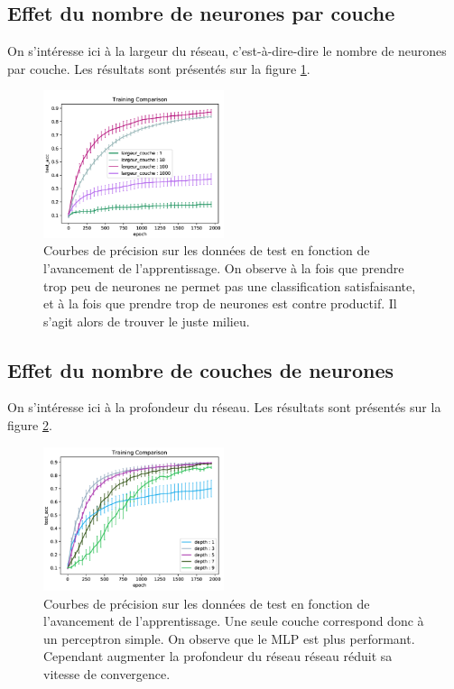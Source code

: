 \subsection{Effet du nombre de neurones par couche}
On s'intéresse ici à la largeur du réseau, c’est-à-dire-dire le nombre de neurones par couche. Les résultats sont présentés sur la figure \ref{MLP_largeur}.

\begin{figure}[!h]
\centering
\includegraphics[width=150pt]{"images/MLP/MLP_largeur"}
\caption{Courbes de précision sur les données de test en fonction de l'avancement de l'apprentissage. On observe  à la fois que prendre trop peu de neurones ne permet pas une classification satisfaisante, et à la fois que prendre trop de neurones est contre productif. Il s'agit alors de trouver le juste milieu.\\ }
\label{MLP_largeur}
\end{figure}

\subsection{Effet du nombre de couches de neurones}
On s'intéresse ici à la profondeur du réseau. Les résultats sont présentés sur la figure \ref{MLP_profondeur}.

\begin{figure}[!h]
\centering
\includegraphics[width=150pt]{"images/MLP/MLP_profondeur"}
\caption{Courbes de précision sur les données de test en fonction de l'avancement de l'apprentissage. Une seule couche correspond donc à un perceptron simple. On observe que le MLP est plus performant. Cependant augmenter la profondeur du réseau réseau réduit sa vitesse de convergence.\\ }
\label{MLP_profondeur}
\end{figure}

